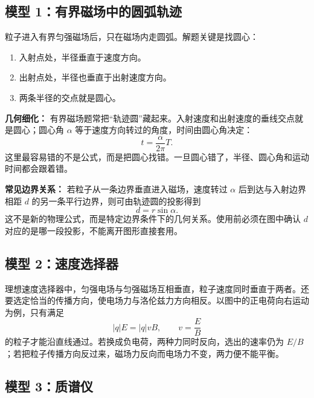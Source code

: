 \subsection*{模型 1：有界磁场中的圆弧轨迹}

粒子进入有界匀强磁场后，只在磁场内走圆弧。解题关键是找圆心：
\begin{enumerate}
  \item 入射点处，半径垂直于速度方向。
  \item 出射点处，半径也垂直于出射速度方向。
  \item 两条半径的交点就是圆心。
\end{enumerate}

\begin{center}


\label{fig:magnetic-boundary-arc}
\end{center}

\textbf{几何细化：} 有界磁场题常把“轨迹圆”藏起来。入射速度和出射速度的垂线交点就是圆心；圆心角 $\alpha$ 等于速度方向转过的角度，时间由圆心角决定：
\[
t=\frac{\alpha}{2\pi}T.
\]
这里最容易错的不是公式，而是把圆心找错。一旦圆心错了，半径、圆心角和运动时间都会跟着错。

\textbf{常见边界关系：} 若粒子从一条边界垂直进入磁场，速度转过 $\alpha$ 后到达与入射边界相距 $d$ 的另一条平行边界，则可由轨迹圆的投影得到
\[
d=r\sin\alpha.
\]
这不是新的物理公式，而是特定边界条件下的几何关系。使用前必须在图中确认 $d$ 对应的是哪一段投影，不能离开图形直接套用。

\subsection*{模型 2：速度选择器}

理想速度选择器中，匀强电场与匀强磁场互相垂直，粒子速度同时垂直于两者。还要选定恰当的传播方向，使电场力与洛伦兹力方向相反。以图中的正电荷向右运动为例，只有满足
\[
|q|E=|q|vB,\qquad \boxed{v=\frac{E}{B}}
\]
的粒子才能沿直线通过。若换成负电荷，两种力同时反向，选出的速率仍为 $E/B$；若把粒子传播方向反过来，磁场力反向而电场力不变，两力便不能平衡。

\begin{center}


\label{fig:velocity-selector}
\end{center}

\subsection*{模型 3：质谱仪}

